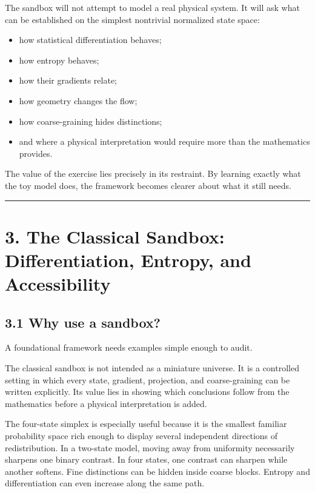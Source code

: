\documentclass[
  11pt,
]{article}
\providecommand{\tightlist}{%
  \setlength{\itemsep}{0pt}\setlength{\parskip}{0pt}}
\begin{document}
The sandbox will not attempt to model a real physical system. It will
ask what can be established on the simplest nontrivial normalized state
space:

\begin{itemize}
\tightlist
\item
  how statistical differentiation behaves;
\item
  how entropy behaves;
\item
  how their gradients relate;
\item
  how geometry changes the flow;
\item
  how coarse-graining hides distinctions;
\item
  and where a physical interpretation would require more than the
  mathematics provides.
\end{itemize}

The value of the exercise lies precisely in its restraint. By learning
exactly what the toy model does, the framework becomes clearer about
what it still needs.

\begin{center}\rule{0.5\linewidth}{0.5pt}\end{center}

\section{3. The Classical Sandbox: Differentiation, Entropy, and
Accessibility}\label{the-classical-sandbox-differentiation-entropy-and-accessibility}

\subsection{3.1 Why use a sandbox?}\label{why-use-a-sandbox}

A foundational framework needs examples simple enough to audit.

The classical sandbox is not intended as a miniature universe. It is a
controlled setting in which every state, gradient, projection, and
coarse-graining can be written explicitly. Its value lies in showing
which conclusions follow from the mathematics before a physical
interpretation is added.

The four-state simplex is especially useful because it is the smallest
familiar probability space rich enough to display several independent
directions of redistribution. In a two-state model, moving away from
uniformity necessarily sharpens one binary contrast. In four states, one
contrast can sharpen while another softens. Fine distinctions can be
hidden inside coarse blocks. Entropy and differentiation can even
increase along the same path.
\end{document}
